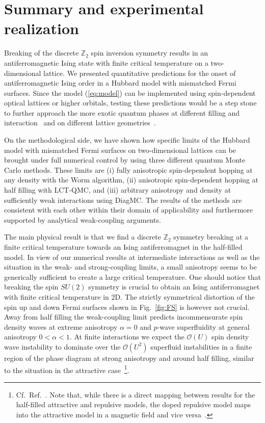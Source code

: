 \documentclass[twocolumn,superscriptaddress,pra,showpacs,longbibliography]{revtex4-1}
\newcommand{\<}{\langle}
\renewcommand{\>}{\rangle}
\begin{document}
\section{Summary and experimental realization \label{sec:summary}}
Breaking of the discrete $\mathbb{Z}_{2}$ spin inversion symmetry results in an antiferromagnetic Ising state with finite critical temperature on a two-dimensional lattice. We presented quantitative predictions for the onset of antiferromagnetic Ising order in a Hubbard model with mismatched Fermi surfaces. Since the model (\ref{eq:model}) can be implemented using spin-dependent optical lattices or higher orbitals, testing these predictions would be a step stone to further approach the more exotic quantum phases at different filling and interaction~\cite{Gukelberger:2014dba} and on different lattice geometries~\cite{Wu:2008ea, Zhao:2008ev}.  

On the methodological side, we have shown how specific limits of the Hubbard model  with mismatched Fermi surfaces on two-dimensional lattices can be brought under full numerical control by using three different quantum Monte Carlo methods. These limits are (i) fully anisotropic spin-dependent hopping at any density with the Worm algorithm, (ii) anisotropic spin-dependent hopping at half filling with LCT-QMC, and (iii) arbitrary anisotropy and density at sufficiently weak interactions using DiagMC. The results of the methods are consistent with each other  within their domain of applicability and furthermore supported by analytical weak-coupling arguments. 

The main physical result is that we find a discrete $\mathbb{Z}_{2}$ symmetry breaking at a finite critical temperature towards an Ising antiferromagnet in the half-filled model. In view of our numerical results at intermediate interactions as well as the situation in the weak- and strong-coupling limits, a small anisotropy seems to be generically sufficient to create a large critical temperature.
One should notice that breaking the spin $SU(2)$ symmetry is crucial to obtain an Ising antiferromagnet with finite critical temperature in 2D. The strictly symmetrical distortion of the spin up and down Fermi surfaces shown in Fig.~\ref{fig:FS} is however not crucial. 
Away from half filling the weak-coupling limit predicts incommensurate spin density waves at extreme anisotropy $\alpha=0$ and $p$-wave superfluidity at general anisotropy $0 < \alpha < 1$. At finite interactions we expect the $\mathcal{O}(U)$ spin density wave instability to dominate over the $\mathcal{O}(U^2)$ superfluid instabilities in a finite region of the phase diagram at strong anisotropy and around half filling, similar to the situation in the attractive case~\footnote{Cf.\ Ref.~\cite{Gukelberger:2014dba}. Note that, while there is a direct mapping between results for the half-filled attractive and repulsive models, the doped repulsive model maps into the attractive model in a magnetic field and vice versa~\cite{ho2009qsh}.}.
\end{document}
